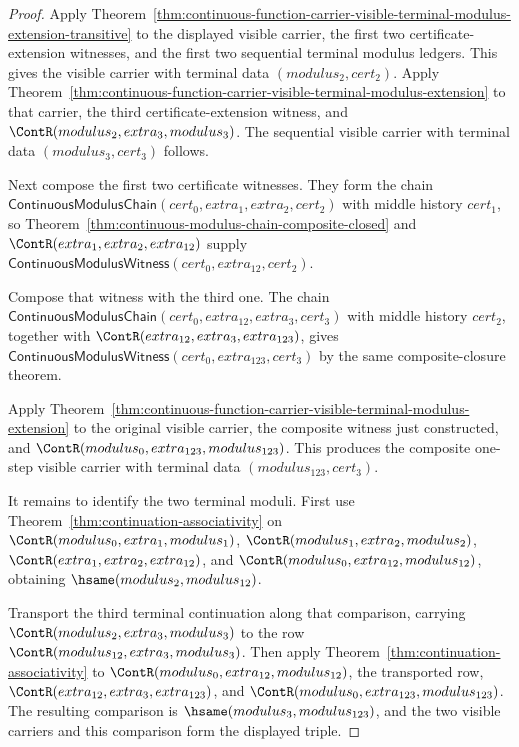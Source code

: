\begin{proof}
Apply
Theorem~\ref{thm:continuous-function-carrier-visible-terminal-modulus-extension-transitive}
to the displayed visible carrier, the first two certificate-extension
witnesses, and the first two sequential terminal modulus ledgers. This gives
the visible carrier with terminal data $(modulus_2,cert_2)$. Apply
Theorem~\ref{thm:continuous-function-carrier-visible-terminal-modulus-extension}
to that carrier, the third certificate-extension witness, and
$\ContR(modulus_2,extra_3,modulus_3)$. The sequential visible carrier with
terminal data $(modulus_3,cert_3)$ follows.

Next compose the first two certificate witnesses. They form the chain
$\mathsf{ContinuousModulusChain}(cert_0,extra_1,extra_2,cert_2)$ with middle
history $cert_1$, so
Theorem~\ref{thm:continuous-modulus-chain-composite-closed} and
$\ContR(extra_1,extra_2,extra_{12})$ supply
$\mathsf{ContinuousModulusWitness}(cert_0,extra_{12},cert_2)$.

Compose that witness with the third one. The chain
$\mathsf{ContinuousModulusChain}(cert_0,extra_{12},extra_3,cert_3)$ with
middle history $cert_2$, together with
$\ContR(extra_{12},extra_3,extra_{123})$, gives
$\mathsf{ContinuousModulusWitness}(cert_0,extra_{123},cert_3)$ by the same
composite-closure theorem.

Apply
Theorem~\ref{thm:continuous-function-carrier-visible-terminal-modulus-extension}
to the original visible carrier, the composite witness just constructed, and
$\ContR(modulus_0,extra_{123},modulus_{123})$. This produces the composite
one-step visible carrier with terminal data $(modulus_{123},cert_3)$.

It remains to identify the two terminal moduli. First use
Theorem~\ref{thm:continuation-associativity} on
$\ContR(modulus_0,extra_1,modulus_1)$,
$\ContR(modulus_1,extra_2,modulus_2)$,
$\ContR(extra_1,extra_2,extra_{12})$, and
$\ContR(modulus_0,extra_{12},modulus_{12})$, obtaining
$\hsame(modulus_2,modulus_{12})$.

Transport the third terminal continuation along that comparison, carrying
$\ContR(modulus_2,extra_3,modulus_3)$ to the row
$\ContR(modulus_{12},extra_3,modulus_3)$. Then apply
Theorem~\ref{thm:continuation-associativity} to
$\ContR(modulus_0,extra_{12},modulus_{12})$, the transported row,
$\ContR(extra_{12},extra_3,extra_{123})$, and
$\ContR(modulus_0,extra_{123},modulus_{123})$. The resulting comparison is
$\hsame(modulus_3,modulus_{123})$, and the two visible carriers and this
comparison form the displayed triple.
\end{proof}
